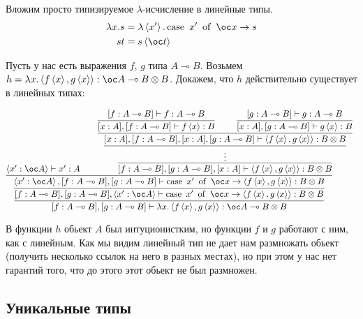 Вложим просто типизируемое $\lambda$-исчисление в линейные типы.
\begin{align*}
	\lambda x.s &= \lambda\pair{x'}.\caseb{x'}{\oc x \rightarrow s} \\
	st          &= s\pair{\oc t}
\end{align*}
\begin{example}
	Пусть у нас есть выражения $f$, $g$  типа $A \multimap B$.
	Возьмем $h = \lambda x.\pair{f\pair{x}, g\pair{x}} : \oc A \multimap B \otimes B$.
	Докажем, что $h$ действительно существует в линейных типах:

	\[
		\infer[]{[f : A \multimap B], [g : A\multimap B]\vdash \lambda x.\pair{f\pair{x}, g\pair{x}} : \oc A \multimap B \otimes B}{
			\infer[]{
				[f : A \multimap B], [g : A \multimap B], \pair{x' : \oc A}
				\vdash \caseb{x'}{\oc x \rightarrow \pair{f\pair{x}, g\pair{x}} : B \otimes B}
			}{
				\infer[]{
					\pair{x' : \oc A}, [f : A \multimap B], [g : A \multimap B]
				\vdash \caseb{x'}{\oc x \rightarrow \pair{f\pair{x}, g\pair{x}} : B \otimes B}
				}{
					\pair{x' : \oc A} \vdash x' : A &&
					\infer[]{[f : A \multimap B], [g : A \multimap B], [x : A]\vdash \pair{f\pair{x}, g\pair{x}} : B \otimes B}{
						\infer[]{\vdots}{
						\infer[]{[x : A], [f : A \multimap B], [x : A], [g : A \multimap B]\vdash \pair{f\pair{x}, g\pair{x}} : B \otimes B}{
								\infer[]{[x : A], [f : A \multimap B]\vdash f\pair{x} : B}{[f : A \multimap B] \vdash f : A \multimap B}
								&&
								\infer[]{[x : A], [g : A \multimap B]\vdash g\pair{x} : B}{[g : A \multimap B] \vdash g : A \multimap B}
							}
						}
					}
				}
			}
		}
	\]

	В функции $h$ обьект $A$ был интуционистким, но функции $f$ и $g$ работают с ним, как с линейным.
	Как мы видим линейный тип не дает нам размножать обьект (получить несколько ссылок на него в разных местах),
	но при этом у нас нет гарантий того, что до этого этот обьект не был размножен.
\end{example}

\subsection{\texorpdfstring{Уникальные типы}{Unique types}}

\newcommand{\ruleVarU}[0]{\mathtt{Var^\odot}}
\newcommand{\ruleVarS}[0]{\mathtt{Var^\otimes}}
\newcommand{\ruleAbs}[0]{\mathtt{Abs}}
\newcommand{\ruleApp}[0]{\mathtt{App}}

